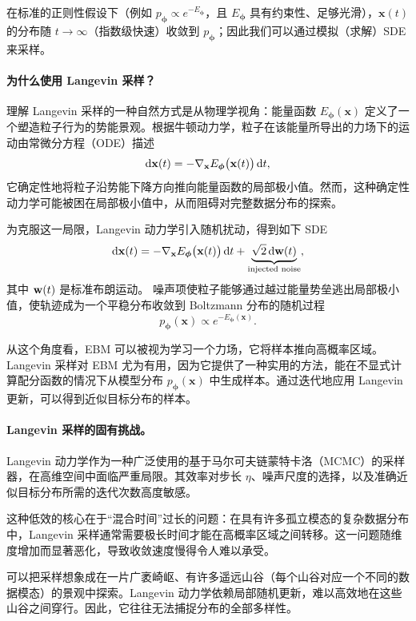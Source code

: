 在标准的正则性假设下（例如 $p_{\bm{\phi}}\propto e^{-E_{\bm{\phi}}}$，且 $E_{\bm{\phi}}$ 具有约束性、足够光滑），$\mathbf{x}(t)$ 的分布随 $t\to\infty$（指数级快速）收敛到 $p_{\bm{\phi}}$；因此我们可以通过模拟（求解）SDE  来采样。



\paragraph{为什么使用 Langevin 采样？}
理解 Langevin 采样的一种自然方式是从物理学视角：能量函数 $ E_{\bm{\phi}}(\mathbf{x}) $ 定义了一个塑造粒子行为的势能景观。根据牛顿动力学，粒子在该能量所导出的力场下的运动由常微分方程（ODE）描述
\[
\mathop{}\!\mathrm{d} \mathbf{x}(t) = -\nabla_{\mathbf{x}} E_{\bm{\phi}}\big(\mathbf{x}(t)\big)  \mathop{}\!\mathrm{d} t,
\]
它确定性地将粒子沿势能下降方向推向能量函数的局部极小值。然而，这种确定性动力学可能被困在局部极小值中，从而阻碍对完整数据分布的探索。

为克服这一局限，Langevin 动力学引入随机扰动，得到如下 SDE
\[
\mathop{}\!\mathrm{d} \mathbf{x}(t) = -\nabla_{\mathbf{x}} E_{\bm{\phi}}\big(\mathbf{x}(t)\big)  \mathop{}\!\mathrm{d} t + \underbrace{\sqrt{2 } \mathop{}\!\mathrm{d} {\mathbf{w}}(t)}_{\text{injected noise}},
\]
其中 ${\mathbf{w}}(t)$ 是标准布朗运动。
噪声项使粒子能够通过越过能量势垒逃出局部极小值，使轨迹成为一个平稳分布收敛到 Boltzmann 分布的随机过程
\[
p_{\bm{\phi}}(\mathbf{x}) \propto e^{-E_{\bm{\phi}}(\mathbf{x})}.
\]

从这个角度看，EBM 可以被视为学习一个力场，它将样本推向高概率区域。Langevin 采样对 EBM 尤为有用，因为它提供了一种实用的方法，能在不显式计算配分函数的情况下从模型分布 $p_{\bm{\phi}}(\mathbf{x})$ 中生成样本。通过迭代地应用 Langevin 更新，可以得到近似目标分布的样本。


\paragraph{Langevin 采样的固有挑战。}
Langevin 动力学作为一种广泛使用的基于马尔可夫链蒙特卡洛（MCMC）的采样器，在高维空间中面临严重局限。其效率对步长 $\eta$、噪声尺度的选择，以及准确近似目标分布所需的迭代次数高度敏感。

这种低效的核心在于``混合时间''过长的问题：在具有许多孤立模态的复杂数据分布中，Langevin 采样通常需要极长时间才能在高概率区域之间转移。这一问题随维度增加而显著恶化，导致收敛速度慢得令人难以承受。

可以把采样想象成在一片广袤崎岖、有许多遥远山谷（每个山谷对应一个不同的数据模态）的景观中探索。Langevin 动力学依赖局部随机更新，难以高效地在这些山谷之间穿行。因此，它往往无法捕捉分布的全部多样性。

